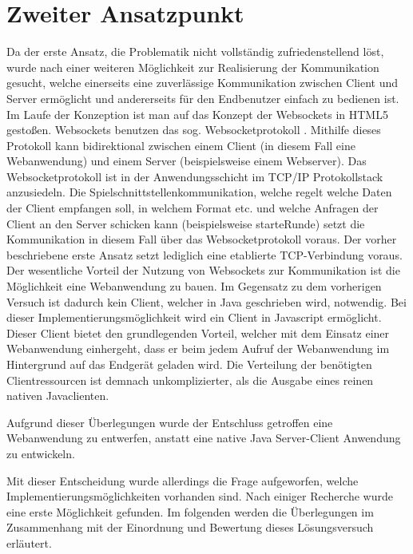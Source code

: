 \section{Zweiter Ansatzpunkt}
Da der erste Ansatz, die Problematik nicht vollständig zufriedenstellend löst, wurde nach einer weiteren Möglichkeit zur Realisierung der Kommunikation gesucht, welche einerseits eine zuverlässige Kommunikation zwischen Client und Server ermöglicht und andererseits für den Endbenutzer einfach zu bedienen ist. Im Laufe der Konzeption ist man auf das Konzept der Websockets in HTML5 gestoßen. Websockets benutzen das sog. Websocketprotokoll \autocite[vgl.][]{WebSocketProtokoll}. Mithilfe dieses Protokoll kann bidirektional zwischen einem Client (in diesem Fall eine Webanwendung) und einem Server (beispielsweise einem Webserver). Das Websocketprotokoll ist in der Anwendungsschicht im TCP/IP Protokollstack anzusiedeln. Die Spielschnittstellenkommunikation, welche regelt welche Daten der Client empfangen soll, in welchem Format etc. und welche Anfragen der Client an den Server schicken kann (beispielsweise \glqq starteRunde\grqq) setzt die Kommunikation in diesem Fall über das Websocketprotokoll voraus. Der vorher beschriebene erste Ansatz setzt lediglich eine etablierte TCP-Verbindung voraus.
Der wesentliche Vorteil der Nutzung von Websockets zur Kommunikation ist die Möglichkeit eine Webanwendung zu bauen. Im Gegensatz zu dem vorherigen Versuch ist dadurch kein Client, welcher in Java geschrieben wird, notwendig. Bei dieser Implementierungsmöglichkeit wird ein Client in Javascript ermöglicht. Dieser Client bietet den grundlegenden Vorteil, welcher mit dem Einsatz einer Webanwendung einhergeht, dass er beim jedem Aufruf der Webanwendung im Hintergrund auf das Endgerät geladen wird. Die Verteilung der benötigten Clientressourcen ist demnach unkomplizierter, als die Ausgabe eines reinen nativen Javaclienten.

Aufgrund dieser Überlegungen wurde der Entschluss getroffen eine Webanwendung zu entwerfen, anstatt eine native Java Server-Client Anwendung zu entwickeln.

Mit dieser Entscheidung wurde allerdings die Frage aufgeworfen, welche Implementierungsmöglichkeiten vorhanden sind. Nach einiger Recherche wurde eine erste Möglichkeit gefunden. Im folgenden werden die Überlegungen im Zusammenhang mit der Einordnung und Bewertung dieses Lösungsversuch erläutert.
